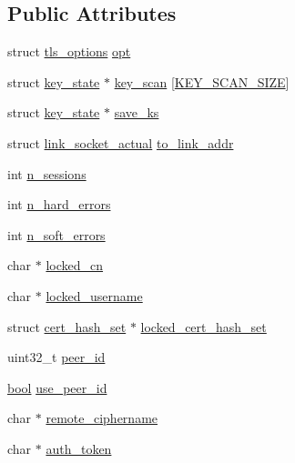 \subsection*{Public Attributes}
\begin{DoxyCompactItemize}
\item 
struct \hyperlink{structtls__options}{tls\+\_\+options} \hyperlink{structtls__multi_a6cd0005716f05da0398d85f6f1693e5d}{opt}
\item 
struct \hyperlink{structkey__state}{key\+\_\+state} $\ast$ \hyperlink{structtls__multi_a27b151b0cdf8d80dbd920478b87fe64b}{key\+\_\+scan} \mbox{[}\hyperlink{ssl__common_8h_a1fa7da1282872926332e449e8fa35dce}{K\+E\+Y\+\_\+\+S\+C\+A\+N\+\_\+\+S\+I\+Z\+E}\mbox{]}
\item 
struct \hyperlink{structkey__state}{key\+\_\+state} $\ast$ \hyperlink{structtls__multi_a522b67985ccd1faa266d4a26c978457a}{save\+\_\+ks}
\item 
struct \hyperlink{structlink__socket__actual}{link\+\_\+socket\+\_\+actual} \hyperlink{structtls__multi_a35cf748c1d74ed47cd38b6c6ea096202}{to\+\_\+link\+\_\+addr}
\item 
int \hyperlink{structtls__multi_ad8e1c72950574c3bdbaafd5e8e0d4cc8}{n\+\_\+sessions}
\item 
int \hyperlink{structtls__multi_a0903b5991f15d2c72dc24850591ec54f}{n\+\_\+hard\+\_\+errors}
\item 
int \hyperlink{structtls__multi_afa4c3a8815c8ac3dd4e1e8271e0c2ee3}{n\+\_\+soft\+\_\+errors}
\item 
char $\ast$ \hyperlink{structtls__multi_a922fe40b847bf8747e99f8b2af5e295d}{locked\+\_\+cn}
\item 
char $\ast$ \hyperlink{structtls__multi_a62bfb73bf4fbdb246053a7ba85412346}{locked\+\_\+username}
\item 
struct \hyperlink{structcert__hash__set}{cert\+\_\+hash\+\_\+set} $\ast$ \hyperlink{structtls__multi_a85b861eacbb27a9f9a9a008dec4fc55a}{locked\+\_\+cert\+\_\+hash\+\_\+set}
\item 
uint32\+\_\+t \hyperlink{structtls__multi_a93c90f22f9fbbd1898ea9708a49ee1f7}{peer\+\_\+id}
\item 
\hyperlink{automatic_8c_abb452686968e48b67397da5f97445f5b}{bool} \hyperlink{structtls__multi_aa1c6b330c9dd68a9f9dd6bf05d454642}{use\+\_\+peer\+\_\+id}
\item 
char $\ast$ \hyperlink{structtls__multi_a5dcccc0eb320a38f6a20923c742046b2}{remote\+\_\+ciphername}
\item 
char $\ast$ \hyperlink{structtls__multi_aa03c9a1c7487bd7bed7e4f73e266614d}{auth\+\_\+token}

\end{DoxyCompactItemize}
